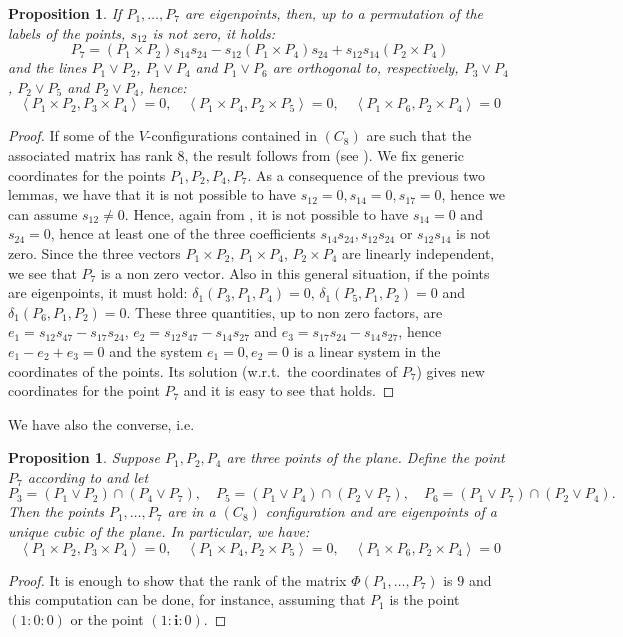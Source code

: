 \documentclass{amsart}
\theoremstyle{plain}
\newtheorem{prop}[lemma]{Proposition}
\theoremstyle{definition}
\newcommand{\scl}[2]{\left\langle {#1}, {#2} \right\rangle}
\newcommand{\iii}{\textbf{i}}
\begin{document}
\begin{prop}
\label{prop:conf8_partA}
If $P_1, \dotsc, P_7$ are eigenpoints, then, up to a permutation of 
the labels of the points, $s_{12}$ is not zero, it holds:
\begin{equation}
\label{formula:ortocentro}
P_7 = (P_1 \times P_2)s_{14}s_{24} -
  s_{12}(P_1 \times P_4)s_{24} + s_{12}s_{14}(P_2 \times P_4)
\end{equation}
and the lines $P_1 \vee P_2$, $P_1 \vee P_4$ and $P_1 \vee P_6$
are orthogonal to, respectively, $P_3 \vee P_4$, $P_2 \vee P_5$ and 
$P_2 \vee P_4$, hence: 
\[
\scl{P_1 \times P_2}{P_3 \times P_4} = 0, \quad 
\scl{P_1 \times P_4}{P_2 \times P_5} = 0, \quad 
\scl{P_1 \times P_6}{P_2 \times P_4} = 0
\]
\end{prop}
\begin{proof}
If some of the $V$-configurations contained in $(C_8)$ are such that the associated matrix has rank 8, 
the result follows from  (see ).
We fix generic coordinates for the points $P_1, P_2, P_4, P_7$.
As a consequence of the previous two lemmas, we have that it is not possible
to have $s_{12}=0, s_{14}=0, s_{17}=0$, hence we can assume $s_{12} \not=0$.
Hence, again from , it is not possible to 
have $s_{14}=0$ and $s_{24}=0$, hence at least one of the three coefficients
$s_{14}s_{24}, s_{12}s_{24}$ or $s_{12}s_{14}$ is not zero. Since the 
three vectors $P_1\times P_2$, $P_1\times P_4$, $P_2\times P_4$ are linearly independent, we see that $P_7$ is a non zero vector. Also in this general situation, if the points are eigenpoints, it must hold: 
$\delta_1(P_3, P_1, P_4) = 0$, $\delta_1(P_5, P_1, P_2) = 0$ and 
$\delta_1(P_6, P_1, P_2)=0$. These three quantities, up to non zero factors, 
are $e_1 = s_{12}s_{47}-s_{17}s_{24}$,  $e_2 = s_{12}s_{47}-s_{14}s_{27}$ and 
$e_3 = s_{17}s_{24}-s_{14}s_{27}$, hence $e_1-e_2+e_3 = 0$ and the system
$e_1=0, e_2 = 0$ is a linear system in the coordinates of the points. 
Its solution (w.r.t.\ the coordinates of $P_7$) gives new coordinates for the point $P_7$ and it is easy to see that  holds.
\end{proof}

We have also the converse, i.e.\
\begin{prop}
Suppose $P_1, P_2, P_4$ are three points of the plane. Define the point
$P_7$ according to \Cref{formula:ortocentro} and let 
\[
P_3 = (P_1 \vee P_2) \cap(P_4 \vee P_7), \quad 
P_5 = (P_1 \vee P_4) \cap (P_2 \vee P_7), \quad
P_6 = (P_1 \vee P_7) \cap (P_2 \vee P_4).
\]
Then the points $P_1, \dotsc, P_7$ are in a $(C_8)$ configuration
and are eigenpoints of a unique cubic 
of the plane. In particular, we have:
\[
\scl{P_1 \times P_2}{P_3 \times P_4} = 0, \quad 
\scl{P_1 \times P_4}{P_2 \times P_5} = 0, \quad 
\scl{P_1 \times P_6}{P_2 \times P_4} = 0
\]
\end{prop}
\begin{proof}
It is enough to show that the rank of the matrix $\Phi(P_1, \dots, P_7)$
is $9$ and this computation can be done, for instance, assuming that 
$P_1$ is the point $(1: 0: 0)$ or the point $(1: \iii: 0)$.
\end{proof}
\end{document}
